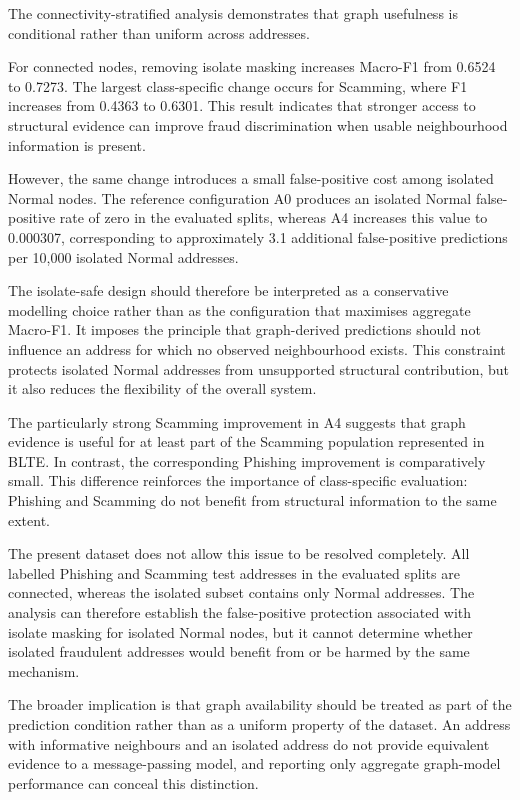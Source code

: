 \documentclass{ieeeaccess}
\begin{document}
The connectivity-stratified analysis demonstrates that graph usefulness is conditional rather than uniform across addresses.

For connected nodes, removing isolate masking increases Macro-F1 from 0.6524 to 0.7273. The largest class-specific change occurs for Scamming, where F1 increases from 0.4363 to 0.6301. This result indicates that stronger access to structural evidence can improve fraud discrimination when usable neighbourhood information is present.

However, the same change introduces a small false-positive cost among isolated Normal nodes. The reference configuration A0 produces an isolated Normal false-positive rate of zero in the evaluated splits, whereas A4 increases this value to 0.000307, corresponding to approximately 3.1 additional false-positive predictions per 10,000 isolated Normal addresses.

The isolate-safe design should therefore be interpreted as a conservative modelling choice rather than as the configuration that maximises aggregate Macro-F1. It imposes the principle that graph-derived predictions should not influence an address for which no observed neighbourhood exists. This constraint protects isolated Normal addresses from unsupported structural contribution, but it also reduces the flexibility of the overall system.

The particularly strong Scamming improvement in A4 suggests that graph evidence is useful for at least part of the Scamming population represented in BLTE. In contrast, the corresponding Phishing improvement is comparatively small. This difference reinforces the importance of class-specific evaluation: Phishing and Scamming do not benefit from structural information to the same extent.

The present dataset does not allow this issue to be resolved completely. All labelled Phishing and Scamming test addresses in the evaluated splits are connected, whereas the isolated subset contains only Normal addresses. The analysis can therefore establish the false-positive protection associated with isolate masking for isolated Normal nodes, but it cannot determine whether isolated fraudulent addresses would benefit from or be harmed by the same mechanism.

The broader implication is that graph availability should be treated as part of the prediction condition rather than as a uniform property of the dataset. An address with informative neighbours and an isolated address do not provide equivalent evidence to a message-passing model, and reporting only aggregate graph-model performance can conceal this distinction.
\end{document}
